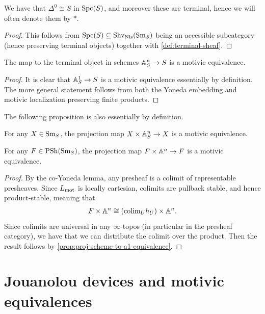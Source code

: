 \documentclass[11pt,openany]{book}
\renewcommand{\Pre}{\mathrm{PSh}}
\begin{document}
\begin{proposition}\label{prop:terminal-object-motivic-spaces} 
We have that $\Delta^0 \cong S$ in $\mathrm{Spc}(S)$, and moreover these are terminal, hence we will often denote them by $\ast$.
\end{proposition}
\begin{proof} This follows from $\mathrm{Spc}(S) \subseteq \mathrm{Shv}_{\mathrm{Nis}}(\mathrm{Sm}_S)$ being an accessible subcategory (hence preserving terminal objects) together with \autoref{def:terminal-sheaf}.
\end{proof}

\begin{proposition} The map to the terminal object in schemes $\mathbb{A}^n_S \to S$ is a motivic equivalence.
\end{proposition}
\begin{proof} It is clear that $\mathbb{A}^1_S \to S$ is a motivic equivalence essentially by definition. The more general statement follows from both the Yoneda embedding and motivic localization preserving finite products.
\end{proof}

The following proposition is also essentially by definition.

\begin{proposition}\label{prop:proj-scheme-to-a1-equivalence} 
For any $X\in \mathrm{Sm}_S$, the projection map $X \times \mathbb{A}^n_S \to X$ is a motivic equivalence.
\end{proposition}

\begin{proposition} For any $F\in \Pre(\Sm_S)$, the projection map $F \times \mathbb{A}^n \to F$ is a motivic equivalence.
\end{proposition}
\begin{proof} By the co-Yoneda lemma, any presheaf is a colimit of representable presheaves. Since $L_{\mathrm{mot}}$ is locally cartesian, colimits are pullback stable, and hence product-stable, meaning that
\begin{align*}
    F \times \mathbb{A}^n \cong \left(\mathrm{colim}_U h_U\right) \times \mathbb{A}^n.
\end{align*}
Since colimits are universal in any $\infty$-topos (in particular in the presheaf category), we have that we can distribute the colimit over the product. Then the result follows by \autoref{prop:proj-scheme-to-a1-equivalence}.
\end{proof}


\section{Jouanolou devices and motivic equivalences}
\end{document}
